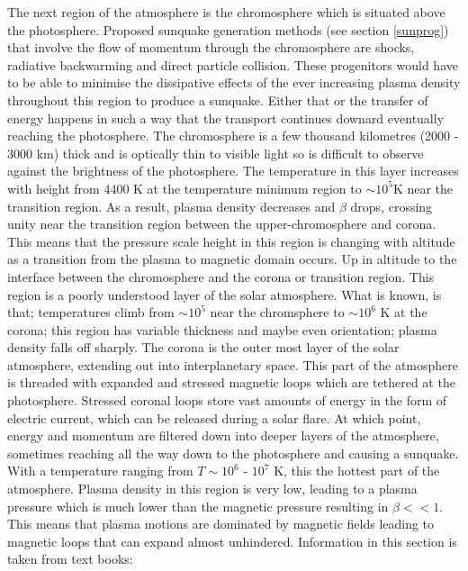 The next region of the atmosphere is the chromosphere which is situated above the photosphere. Proposed sunquake generation methods (see section \ref{sunprog}) that involve the flow of momentum through the chromosphere are shocks, radiative backwarming and direct particle collision. These progenitors would have to be able to minimise the dissipative effects of the ever increasing plasma density throughout this region to produce a sunquake. Either that or the transfer of energy happens in such a way that the transport continues downard eventually reaching the photosphere. The chromosphere is a few thousand kilometres (2000 - 3000 km) thick and is optically thin to visible light so is difficult to observe against the brightness of the photosphere. The temperature in this layer increases with height from 4400 K at the temperature minimum region to $\sim10^{5}$K near the transition region. As a result, plasma density decreases and $\beta$ drops, crossing unity near the transition region between the upper-chromosphere and corona. This means that the pressure scale height in this region is changing with altitude as a transition from the plasma to magnetic domain occurs. Up in altitude to the interface between the chromosphere and the corona or transition region. This region is a poorly understood layer of the solar atmosphere. What is known, is that; temperatures climb from $\sim10^{5}$ near the chromsphere to $\sim10^{6}$ K at the corona; this region has variable thickness and maybe even orientation; plasma density falls off sharply. The corona is the outer most layer of the solar atmosphere, extending out into interplanetary space. This part of the atmosphere is threaded with expanded and stressed magnetic loops which are tethered at the photosphere. Stressed coronal loops store vast amounts of energy in the form of electric current, which can be released during a solar flare. At which point, energy and momentum are filtered down into deeper layers of the atmosphere, sometimes reaching all the way down to the photosphere and causing a sunquake. With a temperature ranging from $T\sim10^{6}$ - $10^{7}$ K, this the hottest part of the atmosphere. Plasma density in this region is very low, leading to a plasma pressure which is much lower than the magnetic pressure resulting in $\beta << 1$. This means that plasma motions are dominated by magnetic fields leading to magnetic loops that can expand almost unhindered. Information in this section is taken from text books: \cite{2003dysu.book.....D, 2004soas.book.....F}



